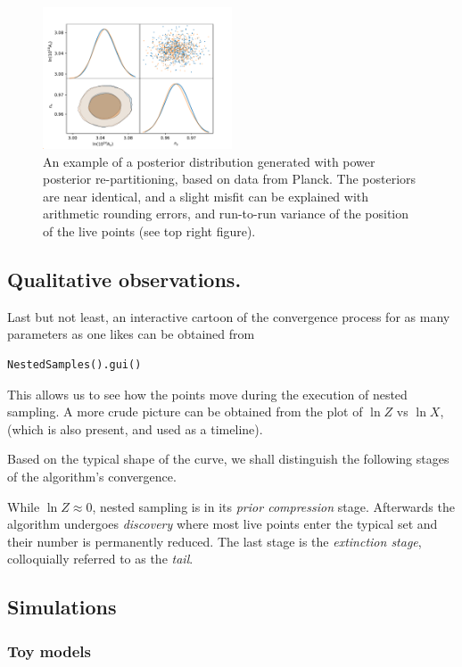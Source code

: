 \documentclass[usenatbib]{mnras}
\begin{document}
\begin{figure}
 \includegraphics[width=0.5\textwidth]{./illustrations/misfit.pdf}
\caption{\label{orgd2e098e}
An example of a posterior distribution generated with power posterior re-partitioning, based on data from Planck. The posteriors are near identical, and a slight misfit can be explained with arithmetic rounding errors, and run-to-run variance of the position of the live points (see top right figure).}
\end{figure}




\subsection{Qualitative observations.}
\label{sec:orgfb39bbf}
Last but not least, an interactive cartoon of the convergence
process for as many parameters as one likes can be obtained from

\begin{verbatim}
NestedSamples().gui()
\end{verbatim}
This allows us to see how the points move during the execution of
nested sampling. A more crude picture can be obtained from the plot
of \(\ln Z\) vs \(\ln X\), (which is also present, and used as a
timeline).

Based on the typical shape of the curve, we shall distinguish the
following stages of the algorithm's convergence. 

While \(\ln Z \approx 0\), nested sampling is in its \emph{prior
compression} stage.  Afterwards the algorithm undergoes \emph{discovery}
where most live points enter the typical set and their number is
permanently reduced. The last stage is the \emph{extinction stage},
colloquially referred to as the \emph{tail}.


\subsection{Simulations}
\label{sec:orgd7b1256}
\subsubsection{Toy models}
\label{sec:org2483686}
\end{document}
